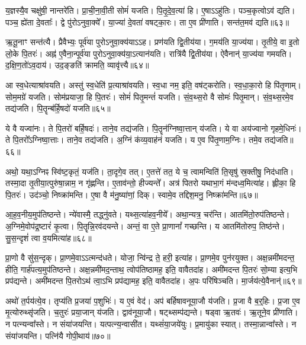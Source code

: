 य॒ज्ञस्यै॒व चक्षु॑षी॒ नान्तरे॑ति।
प्रा॒ची॒ना॒वी॒ती सोमं॑ यजति।
पि॒तृ॒दे॒व॒त्या॑ हि।
ए॒षाऽऽहु॑तिः।
पञ्च॒कृत्वोऽव॑ द्यति।
पञ्च॒ ह्ये॑ता दे॒वताः᳚।
द्वे पु॑रो\-ऽनुवा॒क्ये᳚।
या॒ज्या॑ दे॒वता॑ वषट्का॒रः।
ता ए॒व प्री॑णाति।
सन्त॑त॒मव॑ द्यति॥६३॥

ऋ॒तू॒नाꣳ सन्त॑त्यै।
प्रैवैभ्यः॒ पूर्व॑या पुरो\-ऽनुवा॒क्य॑याऽऽह।
प्रण॑यति द्वि॒तीय॑या।
ग॒मय॑ति या॒ज्य॑या।
तृ॒तीये॒ वा इ॒तो लो॒के पि॒तरः॑।
अह्न॑ ए॒वैना॒न्पूर्व॑या पुरो\-ऽनुवा॒क्य॑या॒\-ऽत्यान॑यति।
रात्रि॑यै द्वि॒तीय॑या।
ऐवैनान्॑ या॒ज्य॑या गमयति।
द॒क्षि॒ण॒तो॑\-ऽव॒दाय॑।
उद॒ङ्ङति॑ क्रामति॒ व्यावृ॑त्त्यै॥६४॥

आ स्व॒धेत्याश्रा॑वयति।
अस्तु॑ स्व॒धेति॑ प्र॒त्याश्रा॑वयति।
स्व॒धा नम॒ इति॒ वष॑ट्करोति।
स्व॒धा॒का॒रो हि पि॑तृ॒णाम्।
सोम॒मग्रे॑ यजति।
सोम॑प्रयाजा॒ हि पि॒तरः॑।
सोमं॑ पितृ॒मन्तं॑ यजति।
सं॒व॒थ्स॒रो वै सोमः॑ पितृ॒मान्।
सं॒व॒थ्स॒रमे॒व तद्य॑जति।
पि॒तॄन्ब॑र्हि॒षदो॑ यजति॥६५॥

ये वै यज्वा॑नः।
ते पि॒तरो॑ बर्\mbox{}हि॒षदः॑।
ताने॒व तद्य॑जति।
पि॒तॄन॑ग्निष्वा॒त्तान् य॑जति।
ये वा अय॑ज्वानो गृहमे॒धिनः॑।
ते पि॒तरो᳚\-ऽग्निष्वा॒त्ताः।
ताने॒व तद्य॑जति।
अ॒ग्निं क॑व्य॒वाह॑नं यजति।
य ए॒व पि॑तृ॒णाम॒ग्निः।
तमे॒व तद्य॑जति॥६६॥

अथो॒ यथा॒\-ऽग्निꣴ स्वि॑ष्ट॒कृतं॒ यज॑ति।
ता॒दृगे॒व तत्।
ए॒तत्ते॑ तत॒ ये च॒ त्वामन्विति॑ ति॒सृषु॑ स्र॒क्तीषु॒ निद॑धाति।
तस्मा॒दा तृ॒तीया॒त्पुरु॑षा॒न्नाम॒ न गृ॑ह्णन्ति।
ए॒ताव॑न्तो॒ हीज्यन्ते᳚।
अत्र॑ पितरो यथाभा॒गं म॑न्दध्व॒मित्या॑ह।
ह्लीका॒ हि पि॒तरः॑।
उद॑ञ्चो॒ निष्क्रा॑मन्ति।
ए॒षा वै म॑नु॒ष्या॑णां॒ दिक्।
स्वामे॒व तद्दिश॒मनु॒ निष्क्रा॑मन्ति॥६७॥

आ॒ह॒व॒नीय॒मुप॑तिष्ठन्ते।
न्ये॑वास्मै॒ तद्ध्नु॑वते।
यथ्स॒त्या॑हव॒नीये᳚।
अथा॒न्यत्र॒ चर॑न्ति।
आतमि॑तो॒रुप॑तिष्ठन्ते।
अ॒ग्निमे॒वोप॑द्र॒ष्टारं॑ कृ॒त्वा।
पि॒तॄन्नि॒रव॑दयन्ते।
अन्तं॒ वा ए॒ते प्रा॒णानां᳚ गच्छन्ति।
य आतमि॑तोरुप॒ तिष्ठ॑न्ते।
सु॒स॒न्दृशं॑ त्वा व॒यमित्या॑ह॥६८॥

प्रा॒णो वै सु॑स॒न्दृक्।
प्रा॒णमे॒वाऽऽत्मन्द॑धते।
योजा॒ न्वि॑न्द्र ते॒ हरी॒ इत्या॑ह।
प्रा॒णमे॒व पुन॑रयुक्त।
अक्ष॒न्नमी॑मदन्त॒ हीति॒ गार्\mbox{}ह॑पत्य॒मुप॑तिष्ठन्ते।
अक्ष॒न्नमी॑मद॒न्ताथ॒ त्वोप॑तिष्ठामह॒ इति॒ वावैतदा॑ह।
अमी॑मदन्त पि॒तरः॑ सो॒म्या इत्य॒भि प्रप॑द्यन्ते।
अमी॑मदन्त पि॒तरोऽथ॑ त्वा॒ऽभि प्रप॑द्यामह॒ इति॒ वावैतदा॑ह।
अ॒पः परि॑षिञ्चति।
मा॒र्जय॑त्ये॒वैनान्॑॥६९॥

अथो॑ त॒र्पय॑त्ये॒व।
तृप्य॑ति प्र॒जया॑ प॒शुभिः॑।
य ए॒वं वेद॑।
अप॑ बर्\mbox{}हिषावनूया॒जौ य॑जति।
प्र॒जा वै ब॒र्॒हिः।
प्र॒जा ए॒व मृ॒त्योरुथ्सृ॑जति।
च॒तुरः॑ प्रया॒जान् य॑जति।
द्वाव॑नूया॒जौ।
षट्थ्सम्प॑द्यन्ते।
षड्वा ऋ॒तवः॑।
ऋ॒तूने॒व प्री॑णाति।
न पत्न्यन्वा᳚स्ते।
न संया॑जयन्ति।
यत्पत्न्य॒न्वासी॑त।
यथ्सं॑या॒जये॑युः।
प्र॒मायु॑का स्यात्।
तस्मा॒न्नान्वा᳚स्ते।
न संया॑जयन्ति।
पत्नि॑यै गोपी॒थाय॑॥७०॥


